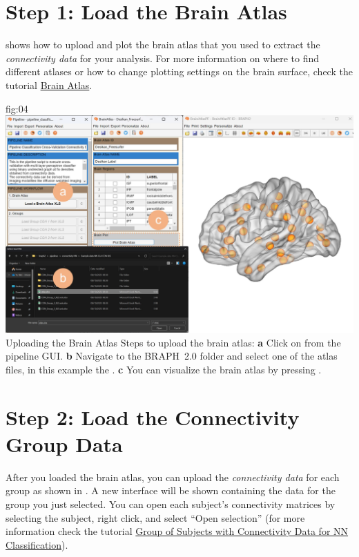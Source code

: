 \documentclass[justified]{tufte-handout}
\begin{document}
{\clearpage
\section{Step 1: Load the Brain Atlas}

 shows how to upload and plot the brain atlas that you used to extract the \emph{connectivity data} for your analysis. For more information on where to find different atlases or how to change plotting settings on the brain surface, check the tutorial \href{https://github.com/braph-software/BRAPH-2/tree/develop/tutorials/general/tut_ba}{Brain Atlas}.

	{fig:04}
	{
	\includegraphics{fig04.jpg}
	}
	{Uploading the Brain Atlas}
	{
	Steps to upload the brain atlas:
	{\bf a} Click on  from the pipeline GUI.
	{\bf b} Navigate to the BRAPH~2.0 folder  and select one of the atlas files, in this example the . 
	{\bf c} You can visualize the brain atlas by pressing . 
	}
 
\clearpage
\section{Step 2: Load the Connectivity Group Data}

After you loaded the brain atlas, you can upload the \emph{connectivity data} for each group as shown in . A new interface will be shown containing the data for the group you just selected. You can open each subject’s connectivity matrices by selecting the subject, right click, and select “Open selection” (for more information check the tutorial \href{https://github.com/braph-software/BRAPH-2/tree/develop/tutorials/general/tut_gr_con_nn/tut_gr_con_nn.pdf}{Group of Subjects with Connectivity Data for NN Classification}).

}
\end{document}
